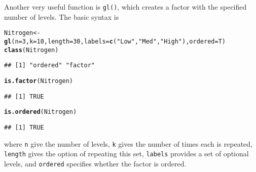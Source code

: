 \documentclass[12pt,A4,makeidx]{article}\usepackage[]{graphicx}\usepackage[]{xcolor}
\makeatletter
\newcommand{\hlnum}[1]{\textcolor[rgb]{0.686,0.059,0.569}{#1}}%
\newcommand{\hlstr}[1]{\textcolor[rgb]{0.192,0.494,0.8}{#1}}%
\newcommand{\hlstd}[1]{\textcolor[rgb]{0.345,0.345,0.345}{#1}}%
\newcommand{\hlkwb}[1]{\textcolor[rgb]{0.69,0.353,0.396}{#1}}%
\newcommand{\hlkwc}[1]{\textcolor[rgb]{0.333,0.667,0.333}{#1}}%
\newcommand{\hlkwd}[1]{\textcolor[rgb]{0.737,0.353,0.396}{\textbf{#1}}}%
\newenvironment{kframe}{%
 \def\at@end@of@kframe{}%
 \ifinner\ifhmode%
  \def\at@end@of@kframe{\end{minipage}}%
  \begin{minipage}{\columnwidth}%
 \fi\fi%
 \def\FrameCommand##1{\hskip\@totalleftmargin \hskip-\fboxsep
 \colorbox{shadecolor}{##1}\hskip-\fboxsep
     \hskip-\linewidth \hskip-\@totalleftmargin \hskip\columnwidth}%
 \MakeFramed {\advance\hsize-\width
   \@totalleftmargin\z@ \linewidth\hsize
   \@setminipage}}%
 {\par\unskip\endMakeFramed%
 \at@end@of@kframe}
\newenvironment{knitrout}{}{} %
\makeatother
\begin{document}
Another very useful function is \texttt{gl()}, which creates a factor with the specified number of levels. 
The basic syntax is
\begin{knitrout}
\color{fgcolor}\begin{kframe}
\begin{alltt}
\hlstd{Nitrogen}\hlkwb{<-}\hlkwd{gl}\hlstd{(}\hlkwc{n}\hlstd{=} \hlnum{3}\hlstd{,} \hlkwc{k}\hlstd{=}\hlnum{10}\hlstd{,} \hlkwc{length} \hlstd{=} \hlnum{30}\hlstd{,} \hlkwc{labels} \hlstd{=} \hlkwd{c}\hlstd{(}\hlstr{"Low"}\hlstd{,}\hlstr{"Med"}\hlstd{,}\hlstr{"High"}\hlstd{),} \hlkwc{ordered} \hlstd{= T)}
\hlkwd{class}\hlstd{(Nitrogen)}
\end{alltt}
\begin{verbatim}
## [1] "ordered" "factor"
\end{verbatim}
\begin{alltt}
\hlkwd{is.factor}\hlstd{(Nitrogen)}
\end{alltt}
\begin{verbatim}
## [1] TRUE
\end{verbatim}
\begin{alltt}
\hlkwd{is.ordered}\hlstd{(Nitrogen)}
\end{alltt}
\begin{verbatim}
## [1] TRUE
\end{verbatim}
\end{kframe}
\end{knitrout}
where \texttt{n} give the number of levels, \texttt{k} gives the number of times each is repeated, \texttt{length} gives the
option of repeating this set, \texttt{labels} provides a set of optional levels, and \texttt{ordered} specifies whether the
factor is ordered.
\end{document}
